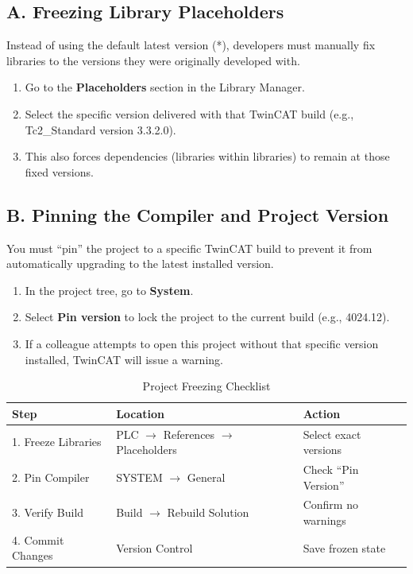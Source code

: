 \documentclass[11pt,a4paper]{article}
\begin{document}
\subsection{A. Freezing Library Placeholders}

Instead of using the default latest version (*), developers must manually fix libraries to the versions they were originally developed with.

\begin{enumerate}
    \item Go to the \textbf{Placeholders} section in the Library Manager.
    \item Select the specific version delivered with that TwinCAT build (e.g., Tc2\_Standard version 3.3.2.0).
    \item This also forces dependencies (libraries within libraries) to remain at those fixed versions.
\end{enumerate}

\subsection{B. Pinning the Compiler and Project Version}

You must ``pin'' the project to a specific TwinCAT build to prevent it from automatically upgrading to the latest installed version.

\begin{enumerate}
    \item In the project tree, go to \textbf{System}.
    \item Select \textbf{Pin version} to lock the project to the current build (e.g., 4024.12).
    \item If a colleague attempts to open this project without that specific version installed, TwinCAT will issue a warning.
\end{enumerate}

\begin{table}[h]
\centering
\begin{tabular}{@{}lll@{}}
\toprule
\textbf{Step} & \textbf{Location} & \textbf{Action} \\
\midrule
1. Freeze Libraries & PLC $\rightarrow$ References $\rightarrow$ Placeholders & Select exact versions \\
2. Pin Compiler & SYSTEM $\rightarrow$ General & Check ``Pin Version'' \\
3. Verify Build & Build $\rightarrow$ Rebuild Solution & Confirm no warnings \\
4. Commit Changes & Version Control & Save frozen state \\
\bottomrule
\end{tabular}
\caption{Project Freezing Checklist}
\end{table}
\end{document}

